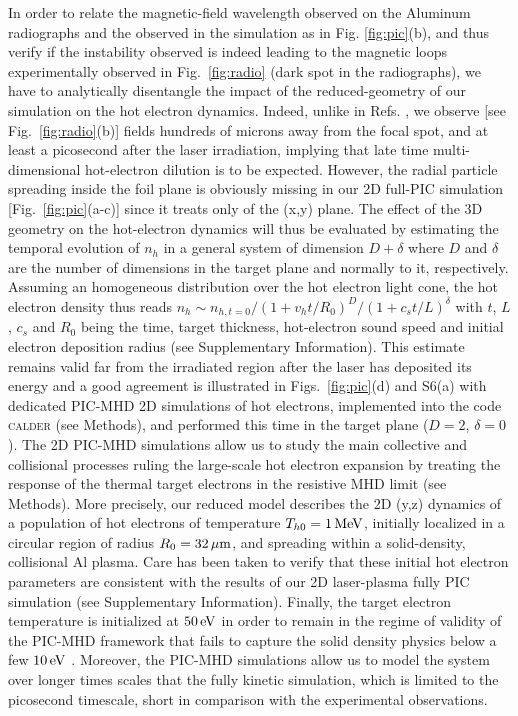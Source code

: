 \documentclass[aps,twocolumn,showpacs,superscriptaddress]{revtex4}
\begin{document}
In order to relate the magnetic-field wavelength observed on the Aluminum radiographs and the observed  in the simulation as in Fig. \ref{fig:pic}(b), and thus verify if the instability observed is indeed leading to the magnetic loops experimentally observed in Fig.~\ref{fig:radio} (dark spot in the radiographs), we have to analytically disentangle the impact of the  reduced-geometry of our simulation on the hot electron dynamics. 
Indeed, unlike in Refs. \cite{PRL_Gode_2017,NJP_Scott_2017}, we observe [see Fig.~\ref{fig:radio}(b)] fields hundreds of microns away from the focal spot, and at least a picosecond after the laser irradiation, implying that late time multi-dimensional hot-electron dilution is to be expected. 
However, the radial particle spreading inside  the foil plane is obviously missing in our 2D full-PIC simulation [Fig.~\ref{fig:pic}(a-c)] since it treats only of the (x,y) plane. The effect of the 3D geometry on the hot-electron dynamics will thus be evaluated by estimating the   temporal evolution  of $n_h$ in a general system of dimension $D+\delta$ where $D$ and $\delta$ are the number of dimensions in the target plane and normally to it, respectively.
Assuming an homogeneous distribution over the hot electron light cone, the hot electron density thus reads $n_{h}\sim n_{h,  t=0} /(1+ v_h t /R_0)^D/(1+c_s t/L)^\delta $ with $t$, $L$, $c_s$ and $R_0$ being the time, target thickness, hot-electron sound speed and initial electron deposition radius (see Supplementary Information). 
This estimate remains valid far from the irradiated region after the laser has deposited its energy and  a good agreement is illustrated in Figs.~\ref{fig:pic}(d)  and S6(a) with dedicated PIC-MHD 2D simulations of hot electrons, implemented into the code \textsc{calder} (see Methods), and performed this time in the target plane ($D=2$, $\delta=0$).
The 2D PIC-MHD simulations allow us to study the main collective and collisional processes ruling the large-scale hot electron expansion by treating the response of the thermal target electrons in the resistive MHD limit (see Methods). More precisely, our reduced model describes the 2D (y,z) dynamics of a population of hot electrons of temperature $T_{h0}=1 \,\rm MeV$, initially localized in a circular region of radius $R_0=32\,\rm \mu m$, and spreading within a solid-density, collisional Al plasma. 
Care has been taken to verify that these initial hot electron parameters are consistent with the results of our 2D laser-plasma fully PIC simulation (see Supplementary Information). Finally, the target electron temperature is initialized at $50\,\rm eV$ in order to remain in  the regime of validity of the PIC-MHD framework that  fails to capture the solid  density physics below a few $10\,\rm eV$ \cite{POP_Perez_2012}. Moreover, the PIC-MHD simulations allow us to model the system over longer times scales that the fully kinetic simulation, which is limited to the picosecond timescale, short in comparison with the experimental observations.
\end{document}

